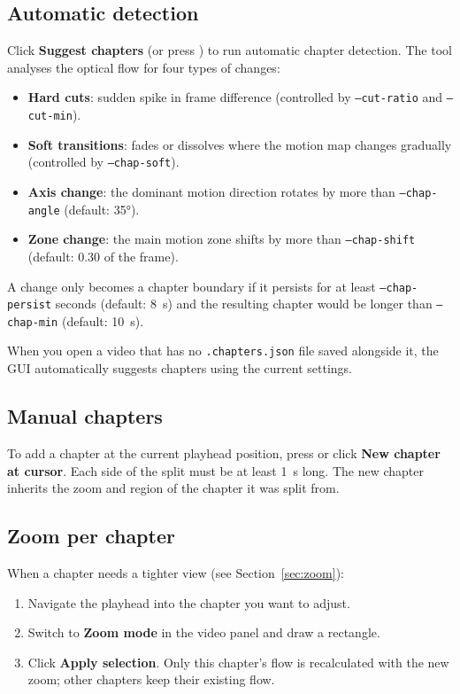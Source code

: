 \documentclass[11pt,a4paper]{article}
\newcommand{\code}[1]{\texttt{#1}}
\newcommand{\key}[1]{\fbox{\small\texttt{#1}}}
\begin{document}
\subsection{Automatic detection}

Click \textbf{Suggest chapters} (or press \key{G}) to run automatic chapter detection. The tool analyses the optical flow for four types of changes:

\begin{itemize}[noitemsep]
  \item \textbf{Hard cuts}: sudden spike in frame difference (controlled by \code{--cut-ratio} and \code{--cut-min}).
  \item \textbf{Soft transitions}: fades or dissolves where the motion map changes gradually (controlled by \code{--chap-soft}).
  \item \textbf{Axis change}: the dominant motion direction rotates by more than \code{--chap-angle} (default: 35°).
  \item \textbf{Zone change}: the main motion zone shifts by more than \code{--chap-shift} (default: 0.30 of the frame).
\end{itemize}

A change only becomes a chapter boundary if it persists for at least \code{--chap-persist} seconds (default: 8~s) and the resulting chapter would be longer than \code{--chap-min} (default: 10~s).

When you open a video that has no \code{.chapters.json} file saved alongside it, the GUI automatically suggests chapters using the current settings.

\subsection{Manual chapters}

To add a chapter at the current playhead position, press \key{N} or click \textbf{New chapter at cursor}. Each side of the split must be at least 1~s long. The new chapter inherits the zoom and region of the chapter it was split from.

\subsection{Zoom per chapter}

When a chapter needs a tighter view (see Section~\ref{sec:zoom}):

\begin{enumerate}[noitemsep]
  \item Navigate the playhead into the chapter you want to adjust.
  \item Switch to \textbf{Zoom mode} in the video panel and draw a rectangle.
  \item Click \textbf{Apply selection}. Only this chapter's flow is recalculated with the new zoom; other chapters keep their existing flow.
\end{enumerate}
\end{document}
